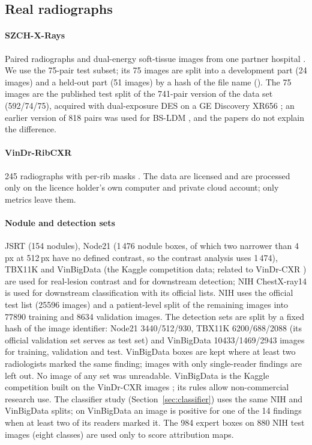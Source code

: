 \subsection{Real radiographs}
\paragraph{SZCH-X-Rays} Paired radiographs and dual-energy soft-tissue images from one partner hospital \citep{sun2026bsldm,sun2026debonedit}. We use the
75-pair test subset; its 75 images are split into a development part (24 images) and a held-out part (51 images) by a hash of the file name
(). The 75 images are the published test split of the 741-pair version of the data set (592/74/75), acquired with dual-exposure DES on a GE
Discovery XR656 \citep{sun2026debonedit}; an earlier version of 818 pairs was used for BS-LDM \citep{sun2026bsldm}, and the papers do not
explain the difference.

\paragraph{VinDr-RibCXR} 245 radiographs with per-rib masks \citep{nguyen2021ribcxr}. The data are licensed and are processed only on the licence
holder's own computer and private cloud account; only metrics leave them.

\paragraph{Nodule and detection sets} JSRT \citep{shiraishi2000jsrt} (154 nodules), Node21 \citep{sogancioglu2024node21} (1\,476 nodule boxes,
of which two narrower than 4\,px at 512\,px have no defined contrast, so the contrast analysis uses 1\,474),
TBX11K \citep{liu2020tbx11k} and VinBigData (the Kaggle competition data; related to VinDr-CXR \citep{nguyen2022vindrcxr}) are used for real-lesion contrast
and for downstream detection; NIH ChestX-ray14 \citep{wang2017chestxray} is used for downstream classification with its official lists.
NIH uses the official test list (\num{25596} images) and a patient-level split of the remaining images into \num{77890} training and \num{8634}
validation images. The detection sets are split by a fixed hash of the image identifier: Node21 \num{3440}/\num{512}/\num{930}, TBX11K
\num{6200}/\num{688}/\num{2088} (its official validation set serves as test set) and VinBigData \num{10433}/\num{1469}/\num{2943} images for
training, validation and test. VinBigData boxes are kept where at least two radiologists marked the same finding; images with only single-reader
findings are left out. No image of any set was unreadable. VinBigData is the Kaggle competition built on the VinDr-CXR images \citep{vinbigdata2020kaggle}; its rules allow non-commercial research use.
The classifier study (Section~\ref{sec:classifier}) uses the same NIH and VinBigData splits; on VinBigData an image is positive for one of the
14 findings when at least two of its readers marked it. The 984 expert boxes on 880 NIH test images (eight classes) are used only to score
attribution maps.


